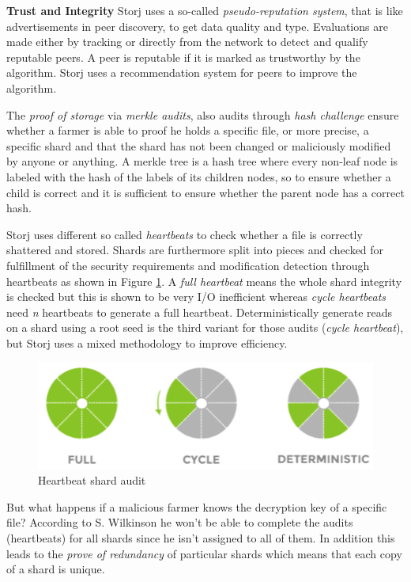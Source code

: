\textbf{Trust and Integrity} Storj uses a so-called \textit{pseudo-reputation system}, that is like advertisements in peer discovery, to get data quality and type. Evaluations are made either by tracking or directly from the network to detect and qualify reputable peers. A peer is reputable if it is marked as trustworthy by the algorithm. Storj uses a recommendation system for peers to improve the algorithm.

The \textit{proof of storage} via \textit{merkle audits}, also audits through \textit{hash challenge} ensure whether a farmer is able to proof he holds a specific file, or more precise, a specific shard and that the shard has not been changed or maliciously modified by anyone or anything. A merkle tree is a hash tree where every non-leaf node is labeled with the hash of the labels of its children nodes, so to ensure whether a child is correct and it is sufficient to ensure whether the parent node has a correct hash.

Storj uses different so called \textit{heartbeats} to check whether a file is correctly shattered and stored. Shards are furthermore split into pieces and checked for fulfillment of the security requirements and modification detection through heartbeats as shown in Figure \ref{storj_heartbeat}. A \textit{full heartbeat} means the whole shard integrity is checked but this is shown to be very I/O inefficient whereas \textit{cycle heartbeats} need \textsl{n} heartbeats to generate a full heartbeat. Deterministically generate reads on a shard using a root seed is the third variant for those audits (\textit{cycle heartbeat}), but Storj uses a mixed methodology to improve efficiency.

	\begin{figure}[ht]
		\begin{center}
		\includegraphics[scale=0.8]{Talk5/storj_heartbeat.PNG}
		\end{center}
		\caption{Heartbeat shard audit \cite{storj:PDF}}
		\label{storj_heartbeat}
	\end{figure}

But what happens if a malicious farmer knows the decryption key of a specific file? According to S. Wilkinson he won't be able to complete the audits (heartbeats) for all shards since he isn't assigned to all of them. In addition this leads to the \textit{prove of redundancy} of particular shards which means that each copy of a shard is unique.

